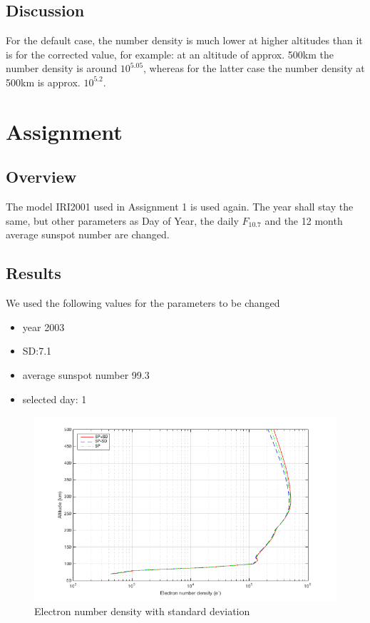 \newpage
\subsection{Discussion}
For the default case, the number density is much lower at higher altitudes than it is for the corrected value, for example: at an altitude of approx. 500km the number density is around $10^{5.05}$, whereas for the latter case the number density at 500km is approx. $10^{5.2}$.





\section{Assignment}
\subsection{Overview}
The model IRI2001 used in Assignment 1 is used again. The year shall stay the same, but other parameters as Day of Year, the daily $F_{10.7}$ and the 12 month average sunspot number are changed.
\subsection{Results}
We used the following values for the parameters to be changed

\begin{itemize}
	\item year 2003
	\item SD:7.1
	\item average sunspot number 99.3
	\item selected day: 1
\end{itemize}

\begin{figure}[h]
	\centering
	\includegraphics[width=\linewidth]{images/ass3plot1}	
	\caption{Electron number density with standard deviation}
	\label{fig:ass3Plot1}
\end{figure}

